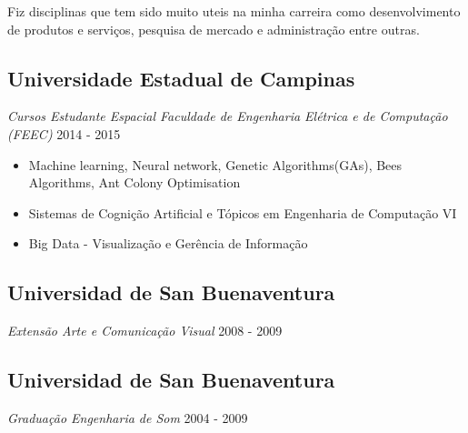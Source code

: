\documentclass[a4paper,10pt]{article}
\begin{document}
Fiz disciplinas que tem sido muito uteis na minha carreira como
desenvolvimento de produtos e serviços,
pesquisa de mercado e administração entre outras.

\subsection*{Universidade Estadual de Campinas}
\textcolor{corSubSection}{\emph{Cursos Estudante Espacial Faculdade de Engenharia Elétrica e de Computação (FEEC)}}
\hfill \textcolor{corSubSection}{2014 - 2015}

\begin{itemize}
    \item Machine learning, Neural network, Genetic Algorithms(GAs), Bees Algorithms, Ant Colony Optimisation
    \item Sistemas de Cognição Artificial e Tópicos em Engenharia de Computação VI
    \item Big Data - Visualização e Gerência de Informação
\end{itemize}

\subsection*{Universidad de San Buenaventura}
\textcolor{corSubSection}{\emph{Extensão Arte e Comunicação Visual}}
\hfill \textcolor{corSubSection}{2008 - 2009}

\subsection*{Universidad de San Buenaventura}
\textcolor{corSubSection}{\emph{Graduação Engenharia de Som}}
\hfill \textcolor{corSubSection}{2004 - 2009}








\end{document}
